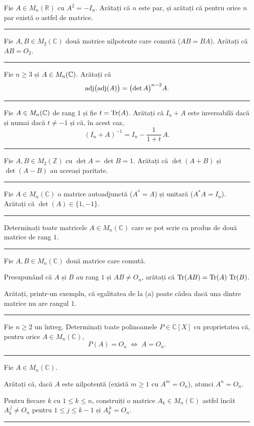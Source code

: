 Fie $A\in M_n(\mathbb{R})$ cu $A^2=-I_n$. Arătați că $n$ este par, și arătați că pentru orice $n$ par există o astfel de matrice.
\vspace{1mm}\hrule

Fie $A,B\in M_2(\mathbb{C})$ două matrice nilpotente care comută ($AB=BA$). Arătați că $AB=O_2$.
\vspace{1mm}\hrule

Fie $n \geq 3$ și $A \in M_n(\mathbb{C})$. Arătați că
\[
  \operatorname{adj}\bigl(\operatorname{adj}(A)\bigr) = \bigl(\det A\bigr)^{n-2} A.
\]
\vspace{1mm}\hrule

Fie $A \in M_n(\mathbb{C})$ de rang $1$ și fie $t = \operatorname{Tr}(A)$. Arătați că $I_n + A$ este inversabilă dacă și numai dacă $t \neq -1$ și că, în acest caz,
\[
(I_n + A)^{-1} = I_n - \frac{1}{1+t}\,A.
\]
\vspace{1mm}\hrule

Fie $A,B\in M_2(\mathbb{Z})$ cu $\det A=\det B=1$. Arătați că $\det(A+B)$ și $\det(A-B)$ au aceeași paritate.
\vspace{1mm}\hrule

Fie $A\in M_n(\mathbb{C})$ o matrice autoadjunctă ($A^*=A$) și unitară ($A^*A=I_n$). Arătați că $\det(A)\in\{1,-1\}$.
\vspace{1mm}\hrule

Determinați toate matricele $A\in M_n(\mathbb{C})$ care se pot scrie ca produs de două matrice de rang $1$.
\vspace{1mm}\hrule

Fie $A,B\in M_n(\mathbb{C})$ două matrice care comută.
\begin{parti}
  \item Presupunând că $A$ și $B$ au rang $1$ și $AB\neq O_n$, arătați că $\operatorname{Tr}(AB)=\operatorname{Tr}(A)\,\operatorname{Tr}(B)$.
  \item Arătați, printr-un exemplu, că egalitatea de la (a) poate cădea dacă una dintre matrice nu are rangul $1$.
\end{parti}
\vspace{1mm}\hrule

Fie $n\ge2$ un întreg. Determinați toate polinoamele $P\in\mathbb{C}[X]$ cu proprietatea că, pentru orice $A\in M_n(\mathbb{C})$,
\[ P(A)=O_n \;\Longleftrightarrow\; A=O_n. \]
\vspace{1mm}\hrule

Fie $A\in M_n(\mathbb{C})$.
\begin{parti}
  \item Arătați că, dacă $A$ este nilpotentă (există $m\ge1$ cu $A^m=O_n$), atunci $A^n=O_n$.
  \item Pentru fiecare $k$ cu $1\le k\le n$, construiți o matrice $A_k\in M_n(\mathbb{C})$ astfel încât $A_k^{\,j}\neq O_n$ pentru $1\le j\le k-1$ și $A_k^{\,k}=O_n$.
\end{parti}
\vspace{1mm}\hrule

